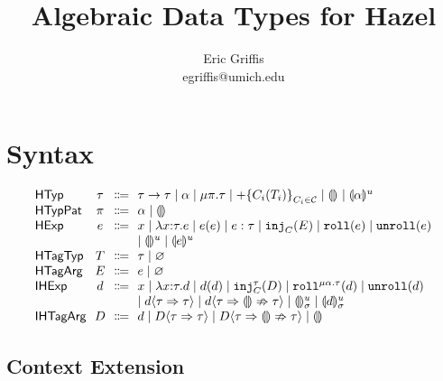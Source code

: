 \documentclass{article}
\title{Algebraic Data Types for Hazel}
\author{Eric Griffis \\ egriffis@umich.edu}
\date{}
\let\originalleft\left
\let\originalright\right
\renewcommand{\left}{\mathopen{}\mathclose\bgroup\originalleft}
\renewcommand{\right}{\aftergroup\egroup\originalright}
\newcommand\Sort[1]{\mathsf{#1}}
\newcommand\IHExp{\Sort{IHExp}}
\newcommand\IHTagArg{\Sort{IHTagArg}}
\newcommand\HExp{\Sort{HExp}}
\newcommand\HTagArg{\Sort{HTagArg}}
\newcommand\HTagTyp{\Sort{HTagTyp}}
\newcommand\HTagVar{\Sort{HTagVar}}
\newcommand\HTyp{\Sort{HTyp}}
\newcommand\HTypPat{\Sort{HTypPat}}
\newcommand\hole[2][]{\llparenthesis#1\rrparenthesis^{#2}}
\newcommand\dhole[3][]{\llparenthesis#1\rrparenthesis_{#2}^{#3}}
\newcommand\Tarrow[2]{#1 \rightarrow #2}
\newcommand\Trec[2]{\mu{#1}.{#2}}
\newcommand\Tsum[1]{+\mathopen{}\left\{#1\right\}}
\newcommand\TagSet{\mathcal{C}}
\newcommand\None{\varnothing}
\newcommand\literal[1]{\mathtt{#1}}
\newcommand\asc[2]{{#1}:{#2}}
\newcommand\Efun[3]{\lambda{#1}{:}{#2}.{#3}}
\newcommand\Eapp[2]{{#1}\left({#2}\right)}
\newcommand\Einj[2]{\literal{inj}_{#1}\left({#2}\right)}
\newcommand\Ecase[2]{\literal{case} \left({#1}\right) \left\{{#2}\right\}}
\newcommand\Eroll[1]{\literal{roll}\left(#1\right)}
\newcommand\Eunroll[1]{\literal{unroll}\left(#1\right)}
\newcommand\Dfun[3]{\lambda{#1}{:}{#2}.{#3}}
\newcommand\Dapp[2]{{#1}\left({#2}\right)}
\newcommand\Dinj[3]{\literal{inj}_{#1}^{#2}\left({#3}\right)}
\newcommand\Dcase[2]{\literal{case} \left({#1}\right) \left\{{#2}\right\}}
\newcommand\Droll[3]{\literal{roll}^{\Trec{#1}{#2}}\left({#3}\right)}
\newcommand\Dunroll[1]{\literal{unroll}\left(#1\right)}
\newcommand\cast[3]{{#1}\langle{#2}\Rightarrow{#3}\rangle}
\newcommand\failedcast[3]{{#1}\langle{#2}\Rightarrow{\llparenthesis\rrparenthesis}\nRightarrow{#3}\rangle}
\begin{document}
\maketitle


\section{Syntax}

\[
  \arraycolsep=0pt
  \begin{array}{l@{~~}c@{~~}c@{~~}l}
    \HTyp & \tau & \Coloneqq &
      \Tarrow{\tau}{\tau}
      \mid \alpha
      \mid \Trec{\pi}{\tau}
      \mid \Tsum{C_i(T_i)}_{C_i \in \TagSet}
      \mid \hole{}
      \mid \hole[\alpha]{u}
      \\
    \HTypPat & \pi & \Coloneqq & \alpha \mid \hole{} \\
    \HExp & e & \Coloneqq &
      x
      \mid \Efun{x}{\tau}{e}
      \mid \Eapp{e}{e}
      \mid \asc{e}{\tau}
      \mid \Einj{C}{E}
      \mid \Eroll{e}
      \mid \Eunroll{e}
      \\ & & &
      \mid \hole{u}
      \mid \hole[e]{u}
      \\
    \HTagTyp & T & \Coloneqq & \tau \mid \None \\
    \HTagArg & E & \Coloneqq & e \mid \None \\
    \IHExp & d & \Coloneqq &
      x
      \mid \Dfun{x}{\tau}{d}
      \mid \Dapp{d}{d}
      \mid \Dinj{C}{\tau}{D}
      \mid \Droll{\alpha}{\tau}{d}
      \mid \Dunroll{d}
      \\ & & &
      \mid \cast{d}{\tau}{\tau}
      \mid \failedcast{d}{\tau}{\tau}
      \mid \dhole{\sigma}{u}
      \mid \dhole[d]{\sigma}{u}
      \\
    \IHTagArg & D & \Coloneqq &
      d
      \mid \cast{D}{\tau}{\tau}
      \mid \failedcast{D}{\tau}{\tau}
      \mid \hole{}
      \\
  \end{array}
\]


\subsection{Context Extension}
\end{document}
